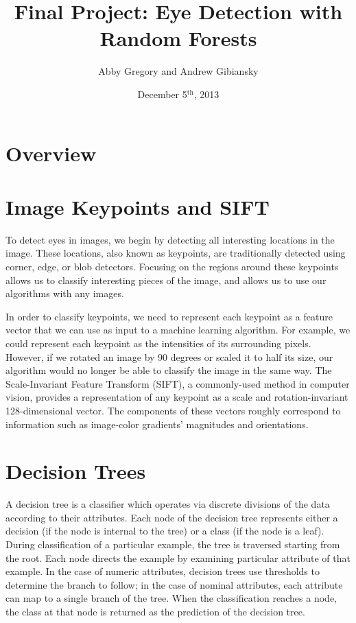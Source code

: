 \documentclass[11pt, twocolumn]{article}
\title{Final Project: Eye Detection with Random Forests}
\author{Abby Gregory and Andrew Gibiansky}
\date{December 5$^\text{th}$, 2013}
\begin{document}
\maketitle

\section*{Overview}

\section*{Image Keypoints and SIFT}
To detect eyes in images, we begin by detecting all interesting locations in the image. These locations,
also known as keypoints, are traditionally detected using corner, edge, or blob detectors. Focusing
on the regions around these keypoints allows us to classify interesting pieces of the image, and
allows us to use our algorithms with any images.

In order to classify keypoints, we need to represent each keypoint as a feature vector that we can
use as input to a machine learning algorithm. For example, we could represent each keypoint as the
intensities of its surrounding pixels. However, if we rotated an image by 90 degrees or scaled it to
half its size, our algorithm would no longer be able to classify the image in the same way.
The Scale-Invariant Feature Transform (SIFT), a commonly-used method in computer vision, provides a
representation of any keypoint as a scale and rotation-invariant 128-dimensional vector. The
components of these vectors roughly correspond to information such as image-color gradients'
magnitudes and orientations.

\section*{Decision Trees}
A decision tree is a classifier which operates via discrete divisions of the data according to their
attributes. Each node of the decision tree represents either a decision (if the node is internal to
the tree) or a class (if the node is a leaf). During classification of a particular example, the
tree is traversed starting from the root. Each node directs the example by examining
particular attribute of that example. In the case of numeric attributes, decision trees use
thresholds to determine the branch to follow; in the case of nominal attributes, each attribute can
map to a single branch of the tree. When the classification reaches a node, the class at that node
is returned as the prediction of the decision tree.
\end{document}

